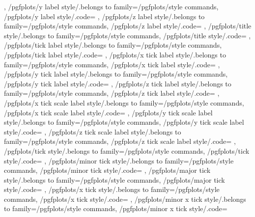 {{	},
	/pgfplots/y label style/.belongs to family=/pgfplots/style commands,
	/pgfplots/y label style/.code={%
	},
	/pgfplots/z label style/.belongs to family=/pgfplots/style commands,
	/pgfplots/z label style/.code={%
	},
	/pgfplots/title style/.belongs to family=/pgfplots/style commands,
	/pgfplots/title style/.code={%
	},
	/pgfplots/tick label style/.belongs to family=/pgfplots/style commands,
	/pgfplots/tick label style/.code={%
	},
	/pgfplots/x tick label style/.belongs to family=/pgfplots/style commands,
	/pgfplots/x tick label style/.code={%
	},
	/pgfplots/y tick label style/.belongs to family=/pgfplots/style commands,
	/pgfplots/y tick label style/.code={%
	},
	/pgfplots/z tick label style/.belongs to family=/pgfplots/style commands,
	/pgfplots/z tick label style/.code={%
	},
	/pgfplots/x tick scale label style/.belongs to family=/pgfplots/style commands,
	/pgfplots/x tick scale label style/.code={%
	},
	/pgfplots/y tick scale label style/.belongs to family=/pgfplots/style commands,
	/pgfplots/y tick scale label style/.code={%
	},
	/pgfplots/z tick scale label style/.belongs to family=/pgfplots/style commands,
	/pgfplots/z tick scale label style/.code={%
	},
	/pgfplots/tick style/.belongs to family=/pgfplots/style commands,
	/pgfplots/tick style/.code={%
	},
	/pgfplots/minor tick style/.belongs to family=/pgfplots/style commands,
	/pgfplots/minor tick style/.code={%
	},
	/pgfplots/major tick style/.belongs to family=/pgfplots/style commands,
	/pgfplots/major tick style/.code={%
	},
	/pgfplots/x tick style/.belongs to family=/pgfplots/style commands,
	/pgfplots/x tick style/.code={%
	},
	/pgfplots/minor x tick style/.belongs to family=/pgfplots/style commands,
	/pgfplots/minor x tick style/.code={%
}}
